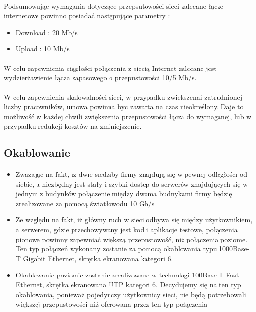 \paragraph{}
Podsumowując wymagania dotyczące przepsutowości sieci zalecane łącze internetowe powinno posiadać następujące parametry :
\begin{itemize}
	\item Download : 20 Mb/s
	\item Upload : 10 Mb/s
\end{itemize}

\paragraph{}
W celu zapewnienia ciągłości połączenia z siecią Internet zalecane jest wydzierżawienie łącza zapasowego o przepustowości 10/5 Mb/s.

\paragraph{}
W celu zapewnienia skalowalności sieci, w przypadku zwiekszenai zatrudnionej liczby pracowników, umowa powinna byc zawarta na czas nieokreślony. Daje to możliwość w każdej chwili zwiększenia przepustowości łącza do wymaganej, lub w przypadku redukcji kosztów na zminiejszenie.


\subsection{Okablowanie}
\paragraph{}


\begin{itemize}
  \item Zważając na fakt, iż dwie siedziby firmy znajdują się w pewnej odległości od siebie, a niezbędny jest stały i szybki dostep do serwerów znajdujących się w jednym z budynków połączenie między dwoma budnykami firmy będzię zrealizowane za pomocą światłowodu 10 Gb/s

  \item Ze względu na fakt, iż główny ruch w sieci odbywa się między użytkownikiem, a serwerem, gdzie przechowywany jest kod i aplikacje testowe, połączenia pionowe powinny zapewniać większą przepustowość, niż połączenia  poziome. Ten typ połączeń wykonany zostanie za pomocą okablowania typu 1000Base-T Gigabit Ethernet, skrętka ekranowana kategori 6.

  \item Okablowanie poziomie zostanie zrealizowane w technologi 100Base-T Fast Ethernet, skrętka ekranowana UTP kategori 6. Decydujemy się na ten typ okablowania, ponieważ pojedynczy użytkownicy sieci, nie będą potrzebowali większej przepustowości niż oferowana przez ten typ połączenia

\end{itemize}
